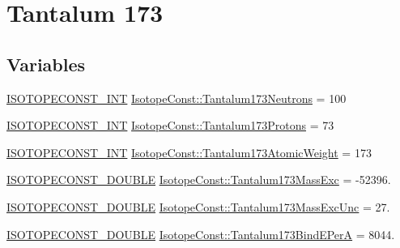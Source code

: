 \hypertarget{group___isotope_const-_tantalum-_ta173}{}\section{Tantalum 173}
\label{group___isotope_const-_tantalum-_ta173}
\subsection*{Variables}
\begin{DoxyCompactItemize}
\item 
\mbox{\hyperlink{group___isotope_const-_macros_ga5f18360b3e99483a35c32d789e62621c}{I\+S\+O\+T\+O\+P\+E\+C\+O\+N\+S\+T\+\_\+\+I\+NT}} \mbox{\hyperlink{group___isotope_const-_tantalum-_ta173_gaa4a62566286a53bb97ee1d11086a78fb}{Isotope\+Const\+::\+Tantalum173\+Neutrons}} = 100
\item 
\mbox{\hyperlink{group___isotope_const-_macros_ga5f18360b3e99483a35c32d789e62621c}{I\+S\+O\+T\+O\+P\+E\+C\+O\+N\+S\+T\+\_\+\+I\+NT}} \mbox{\hyperlink{group___isotope_const-_tantalum-_ta173_ga32ddfb654c5c4015b75a524f097d8ec4}{Isotope\+Const\+::\+Tantalum173\+Protons}} = 73
\item 
\mbox{\hyperlink{group___isotope_const-_macros_ga5f18360b3e99483a35c32d789e62621c}{I\+S\+O\+T\+O\+P\+E\+C\+O\+N\+S\+T\+\_\+\+I\+NT}} \mbox{\hyperlink{group___isotope_const-_tantalum-_ta173_ga9d125ad81d8172541324afe17d164ff3}{Isotope\+Const\+::\+Tantalum173\+Atomic\+Weight}} = 173
\item 
\mbox{\hyperlink{group___isotope_const-_macros_ga8f45a7272ce02c0b4c65c44636ed719a}{I\+S\+O\+T\+O\+P\+E\+C\+O\+N\+S\+T\+\_\+\+D\+O\+U\+B\+LE}} \mbox{\hyperlink{group___isotope_const-_tantalum-_ta173_gadc0ddfd4d6fb5af8383484963bdb541d}{Isotope\+Const\+::\+Tantalum173\+Mass\+Exc}} = -\/52396.
\item 
\mbox{\hyperlink{group___isotope_const-_macros_ga8f45a7272ce02c0b4c65c44636ed719a}{I\+S\+O\+T\+O\+P\+E\+C\+O\+N\+S\+T\+\_\+\+D\+O\+U\+B\+LE}} \mbox{\hyperlink{group___isotope_const-_tantalum-_ta173_ga4909cbb7de15cea5e8e45ecc95811c4c}{Isotope\+Const\+::\+Tantalum173\+Mass\+Exc\+Unc}} = 27.
\item 
\mbox{\hyperlink{group___isotope_const-_macros_ga8f45a7272ce02c0b4c65c44636ed719a}{I\+S\+O\+T\+O\+P\+E\+C\+O\+N\+S\+T\+\_\+\+D\+O\+U\+B\+LE}} \mbox{\hyperlink{group___isotope_const-_tantalum-_ta173_gadc58e4e94a5013623d16cc184eb4068a}{Isotope\+Const\+::\+Tantalum173\+Bind\+E\+PerA}} = 8044.
\item 

\end{DoxyCompactItemize}
